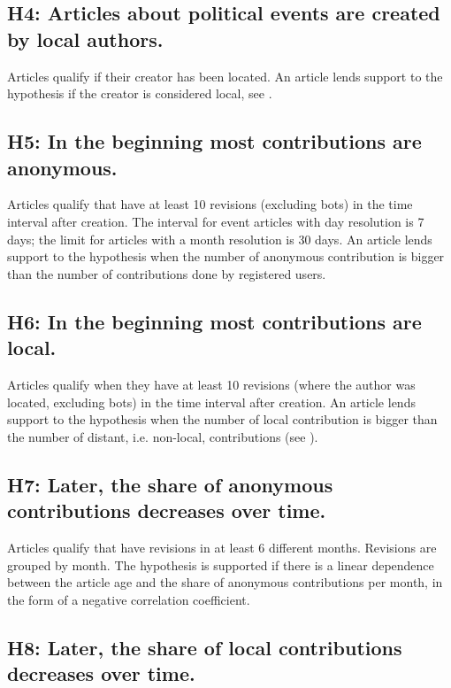 \subsection*{H4: Articles about political events are created by local authors.}

Articles qualify if their creator has been located.
An article lends support to the hypothesis if the creator is considered local, see .

\subsection*{H5: In the beginning most contributions are anonymous.}

Articles qualify that have at least 10 revisions (excluding bots) in the time interval after creation.
The interval for event articles with day resolution is 7 days; the limit for articles with a month resolution is 30 days.
An article lends support to the hypothesis when the number of anonymous contribution is bigger than the number of contributions done by registered users.

\subsection*{H6: In the beginning most contributions are local.}

Articles qualify when they have at least 10 revisions (where the author was located, excluding bots) in the time interval after creation.
An article lends support to the hypothesis when the number of local contribution is bigger than the number of distant, i.e. non-local, contributions (see ).

\subsection*{H7: Later, the share of anonymous contributions decreases over time.}

Articles qualify that have revisions in at least 6 different months.
Revisions are grouped by month.
The hypothesis is supported if there is a linear dependence between the article age and the share of anonymous contributions per month, in the form of a negative correlation coefficient.

\subsection*{H8: Later, the share of local contributions decreases over time.}

